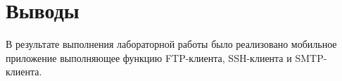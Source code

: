 \documentclass[a4paper, 14pt]{extarticle}
\begin{document}
\section{Выводы}\label{Sect::conclusion}

В результате выполнения лабораторной работы было реализовано мобильное приложение выполняющее функцию FTP-клиента,  SSH-клиента и SMTP-клиента.
\end{document}
